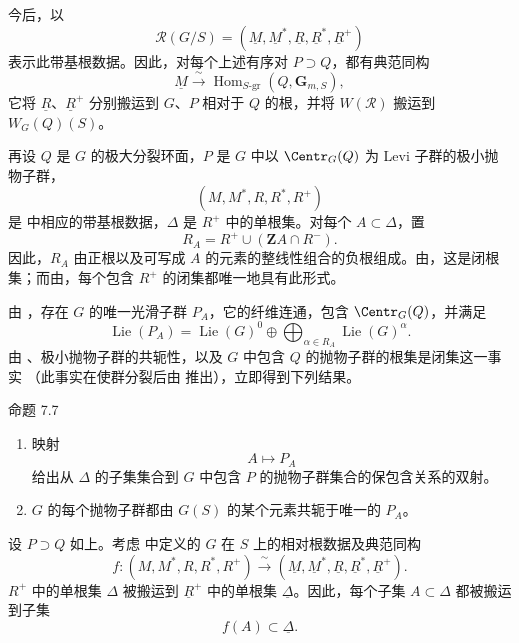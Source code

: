 今后，以
\[
 \mathcal R(G/S)
 =(\underline M,\underline M^*,\underline R,
   \underline R^*,\underline R^+)
\]
表示此带基根数据。因此，对每个上述有序对 \(P\supset Q\)，都有典范同构
\[
 \underline M\xrightarrow{\ \sim\ }
 \operatorname{Hom}_{S\text{-}\mathrm{gr}}(Q,\mathbf G_{m,S}),
\]
它将 \(\underline R\)、\(\underline R^+\) 分别搬运到 \(G\)、\(P\) 相对于 \(Q\) 的根，并将 \(W(\mathcal R)\) 搬运到 \(W_G(Q)(S)\)。


再设 \(Q\) 是 \(G\) 的极大分裂环面，\(P\) 是 \(G\) 中以 \(\Centr_G(Q)\) 为 Levi 子群的极小抛物子群，
\[
 (M,M^*,R,R^*,R^+)
\]
是  中相应的带基根数据，\(\Delta\) 是 \(R^+\) 中的单根集。对每个 \(A\subset\Delta\)，置
\[
 R_A=R^+\cup(\mathbf Z A\cap R^-).
\]
因此，\(R_A\) 由正根以及可写成 \(A\) 的元素的整线性组合的负根组成。由，这是闭根集；而由，每个包含 \(R^+\) 的闭集都唯一地具有此形式。

由 ，存在 \(G\) 的唯一光滑子群 \(P_A\)，它的纤维连通，包含 \(\Centr_G(Q)\)，并满足
\[
 \operatorname{Lie}(P_A)
 =\operatorname{Lie}(G)^0
  \oplus\bigoplus_{\alpha\in R_A}\operatorname{Lie}(G)^\alpha.
\]
由 、极小抛物子群的共轭性，以及 \(G\) 中包含 \(Q\) 的抛物子群的根集是闭集这一事实 \textup{（此事实在使群分裂后由  推出）}，立即得到下列结果。

\begin{sgastatement}{命题 7.7}
\begin{enumerate}[label=\textup{(\roman*)}]
\item 映射
\[
 A\longmapsto P_A
\]
给出从 \(\Delta\) 的子集集合到 \(G\) 中包含 \(P\) 的抛物子群集合的保包含关系的双射。
\item \(G\) 的每个抛物子群都由 \(G(S)\) 的某个元素共轭于唯一的 \(P_A\)。
\end{enumerate}
\end{sgastatement}


设 \(P\supset Q\) 如上。考虑  中定义的 \(G\) 在 \(S\) 上的相对根数据及典范同构
\[
 f:(M,M^*,R,R^*,R^+)
   \xrightarrow{\ \sim\ }
   (\underline M,\underline M^*,\underline R,
    \underline R^*,\underline R^+).
\]
\(R^+\) 中的单根集 \(\Delta\) 被搬运到 \(\underline R^+\) 中的单根集 \(\underline\Delta\)。因此，每个子集 \(A\subset\Delta\) 都被搬运到子集
\[
 f(A)\subset\underline\Delta.
\]

